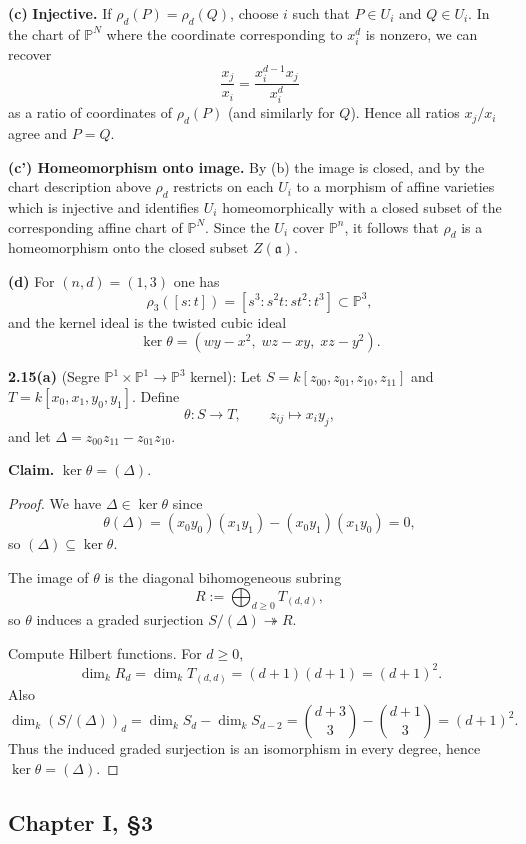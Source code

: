 \documentclass[12pt]{article}
\numberwithin{thm}{subsection}
\numberwithin{defn}{subsection}
\numberwithin{lemma}{subsection}
\numberwithin{example}{subsection}
\numberwithin{notation}{subsection}
\numberwithin{cor}{subsection}
\numberwithin{remark}{subsection}
\numberwithin{condition}{subsection}
\numberwithin{question}{subsection}
\numberwithin{construction}{subsection}
\numberwithin{construction}{subsection}
\numberwithin{construction}{subsection}
\begin{document}
\medskip
\textbf{(c)} \textbf{Injective.}
If $\rho_d(P)=\rho_d(Q)$, choose $i$ such that $P\in U_i$ and $Q\in U_i$.
In the chart of $\mathbb P^N$ where the coordinate corresponding to $x_i^d$ is nonzero, we can recover
\[
\frac{x_j}{x_i}=\frac{x_i^{d-1}x_j}{x_i^d}
\]
as a ratio of coordinates of $\rho_d(P)$ (and similarly for $Q$). Hence all ratios $x_j/x_i$ agree and $P=Q$.

\medskip
\textbf{(c') Homeomorphism onto image.}
By (b) the image is closed, and by the chart description above $\rho_d$ restricts on each $U_i$ to a morphism of affine varieties
which is injective and identifies $U_i$ homeomorphically with a closed subset of the corresponding affine chart of $\mathbb P^N$.
Since the $U_i$ cover $\mathbb P^n$, it follows that $\rho_d$ is a homeomorphism onto the closed subset $Z(\mathfrak a)$.

\medskip
\textbf{(d)} For $(n,d)=(1,3)$ one has
\[
\rho_3([s:t])=[s^3:s^2t:st^2:t^3]\subset \mathbb P^3,
\]
and the kernel ideal is the twisted cubic ideal
\[
\ker\theta=(wy-x^2,\; wz-xy,\; xz-y^2).
\]

\bigskip

\textbf{2.15(a)} (Segre $\mathbb P^1\times\mathbb P^1\to\mathbb P^3$ kernel):
Let $S=k[z_{00},z_{01},z_{10},z_{11}]$ and $T=k[x_0,x_1,y_0,y_1]$.
Define
\[
\theta:S\to T,\qquad z_{ij}\mapsto x_i y_j,
\]
and let $\Delta=z_{00}z_{11}-z_{01}z_{10}$.

\medskip
\textbf{Claim.} $\ker\theta=(\Delta)$.

\begin{proof}
We have $\Delta\in\ker\theta$ since
\[
\theta(\Delta)=(x_0y_0)(x_1y_1)-(x_0y_1)(x_1y_0)=0,
\]
so $(\Delta)\subseteq\ker\theta$.

The image of $\theta$ is the diagonal bihomogeneous subring
\[
R:=\bigoplus_{d\ge 0} T_{(d,d)},
\]
so $\theta$ induces a graded surjection $S/(\Delta)\twoheadrightarrow R$.

Compute Hilbert functions. For $d\ge 0$,
\[
\dim_k R_d=\dim_k T_{(d,d)}=(d+1)(d+1)=(d+1)^2.
\]
Also
\[
\dim_k(S/(\Delta))_d=\dim_k S_d-\dim_k S_{d-2}=\binom{d+3}{3}-\binom{d+1}{3}=(d+1)^2.
\]
Thus the induced graded surjection is an isomorphism in every degree, hence $\ker\theta=(\Delta)$.
\end{proof}

\subsection{Chapter I, \S 3}
\end{document}
